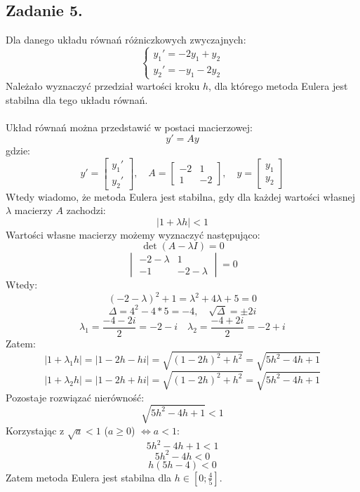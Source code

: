 \documentclass{article}
\begin{document}
\subsection{Zadanie 5.}
Dla danego układu równań różniczkowych zwyczajnych:
\begin{equation}
    \begin{cases}
        y_1' = -2y_1 + y_2 \\
        y_2' = -y_1 - 2y_2
    \end{cases} \nonumber
\end{equation}
Należało wyznaczyć przedział wartości kroku $h$, dla którego metoda Eulera jest stabilna dla tego układu równań.
\\\\
Układ równań można przedstawić w postaci macierzowej:
$$y' = Ay$$
gdzie:
\begin{equation}
    y' =
    \begin{bmatrix}
        y_1' \\ y_2'
    \end{bmatrix}
    ,\quad
    A =
    \begin{bmatrix}
        -2 & 1 \\
        1 & -2
    \end{bmatrix}
    ,\quad
    y =
    \begin{bmatrix}
        y_1 \\ y_2
    \end{bmatrix}
\nonumber
\end{equation}
Wtedy wiadomo, że metoda Eulera jest stabilna, gdy dla każdej wartości własnej $\lambda$ macierzy $A$ zachodzi:
$$|1 + \lambda h| < 1 $$
Wartości własne macierzy możemy wyznaczyć następująco:
$$\det(A-\lambda I) = 0 $$
\begin{equation}
    \begin{vmatrix}
        -2-\lambda & 1 \\
        -1 & -2-\lambda
    \end{vmatrix}
    = 0
\nonumber
\end{equation}
Wtedy:
$$(-2-\lambda)^2 + 1 = \lambda^2 + 4\lambda + 5 = 0$$
$$\Delta = 4^2 - 4*5 = -4, \quad \sqrt{\Delta} = \pm2i$$
$$\lambda_1 = \frac{-4-2i}{2} = -2-i \quad \lambda_2 = \frac{-4+2i}{2} = -2+i$$
Zatem:
$$|1+\lambda_1 h| = |1-2h-hi| = \sqrt{(1-2h)^2 + h^2} = \sqrt{5h^2 - 4h + 1}$$
$$|1+\lambda_2 h| = |1-2h+hi| = \sqrt{(1-2h)^2 + h^2} = \sqrt{5h^2 - 4h + 1}$$
Pozostaje rozwiązać nierówność:
$$\sqrt{5h^2 - 4h + 1} < 1$$
Korzystając z $\sqrt{a} < 1$ ($a \geq 0$) $\iff a < 1$:
$$5h^2 - 4h + 1 < 1$$
$$5h^2 - 4h < 0$$
$$h(5h - 4) < 0$$
Zatem metoda Eulera jest stabilna dla $h \in [0;\frac{4}{5}]$.
\end{document}
